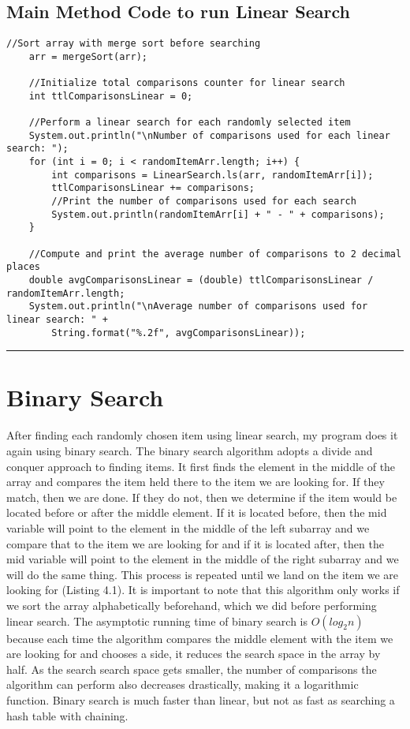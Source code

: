\documentclass[letterpaper, 10pt,DIV=13]{scrartcl}
\numberwithin{equation}{section} %
\numberwithin{figure}{section} %
\numberwithin{table}{section} %
\newcommand{\horrule}[1]{\rule{\linewidth}{#1}} %
\begin{document}
\subsection{Main Method Code to run Linear Search}
\lstset{numbers=left, numberstyle=\tiny, stepnumber=1, numbersep=5pt, basicstyle=\footnotesize\ttfamily}
\begin{lstlisting}[frame=single, ] 
    //Sort array with merge sort before searching
    arr = mergeSort(arr);

    //Initialize total comparisons counter for linear search
    int ttlComparisonsLinear = 0;

    //Perform a linear search for each randomly selected item
    System.out.println("\nNumber of comparisons used for each linear search: ");
    for (int i = 0; i < randomItemArr.length; i++) {
        int comparisons = LinearSearch.ls(arr, randomItemArr[i]);
        ttlComparisonsLinear += comparisons;
        //Print the number of comparisons used for each search
        System.out.println(randomItemArr[i] + " - " + comparisons);
    }

    //Compute and print the average number of comparisons to 2 decimal places
    double avgComparisonsLinear = (double) ttlComparisonsLinear / randomItemArr.length;
    System.out.println("\nAverage number of comparisons used for linear search: " + 
        String.format("%.2f", avgComparisonsLinear));
\end{lstlisting}

\horrule{0pt}  	%

\section{Binary Search}\label{operations}
After finding each randomly chosen item using linear search, my program does it again using binary search. The binary search algorithm adopts a divide and conquer approach to finding items. It first finds the element in the middle of the array and compares the item held there to the item we are looking for. If they match, then we are done. If they do not, then we determine if the item would be located before or after the middle element. If it is located before, then the mid variable will point to the element in the middle of the left subarray and we compare that to the item we are looking for and if it is located after, then the mid variable will point to the element in the middle of the right subarray and we will do the same thing. This process is repeated until we land on the item we are looking for (Listing 4.1). It is important to note that this algorithm only works if we sort the array alphabetically beforehand, which we did before performing linear search. The asymptotic running time of binary search is $O(log_2n)$ because each time the algorithm compares the middle element with the item we are looking for and chooses a side, it reduces the search space in the array by half. As the search search space gets smaller, the number of comparisons the algorithm can perform also decreases drastically, making it a logarithmic function. Binary search is much faster than linear, but not as fast as searching a hash table with chaining.
\end{document}
